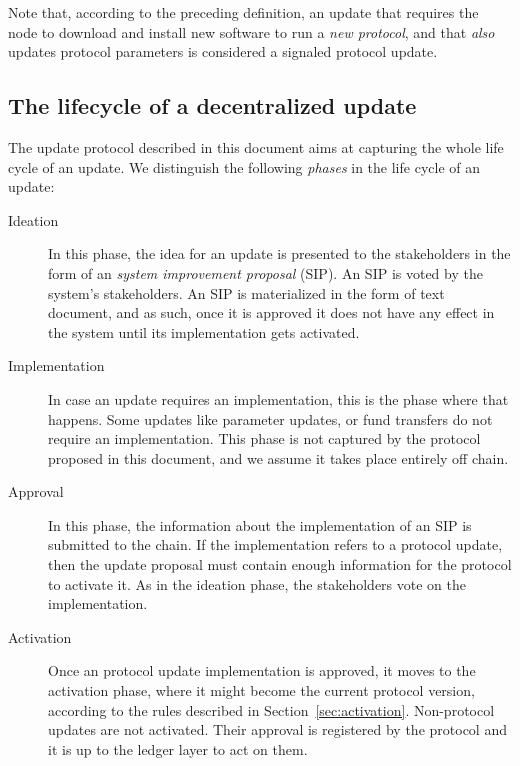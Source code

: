\documentclass[11pt,a4paper]{article}
\begin{document}
Note that, according to the preceding definition, an update that requires the
node to download and install new software to run a \emph{new protocol}, and that
\emph{also} updates protocol parameters is considered a signaled protocol
update.



\subsection{The lifecycle of a decentralized update}
\label{sec:phases-an-update}

The update protocol described in this document aims at capturing the whole life
cycle of an update.
%
%
We distinguish the following \emph{phases} in the life cycle of an update:

\begin{description}
\item[Ideation] In this phase, the idea for an update is presented to the
  stakeholders in the form of an \emph{system improvement proposal} (SIP). An
  SIP is voted by the system's stakeholders. An SIP is materialized in the form
  of text document, and as such, once it is approved it does not have any effect
  in the system until its implementation gets activated.
\item[Implementation] In case an update requires an implementation, this is the
  phase where that happens. Some updates like parameter updates, or fund
  transfers do not require an implementation. This phase is not captured by the
  protocol proposed in this document, and we assume it takes place entirely off
  chain.
\item[Approval] In this phase, the information about the implementation of an
  SIP is submitted to the chain. If the implementation refers to a protocol
  update, then the update proposal must contain enough information for the
  protocol to activate it. As in the ideation phase, the stakeholders vote on
  the implementation.
\item[Activation] Once an protocol update implementation is approved, it moves
  to the activation phase, where it might become the current protocol version,
  according to the rules described in Section~\ref{sec:activation}. Non-protocol
  updates are not activated. Their approval is registered by the protocol and
  it is up to the ledger layer to act on them.
\end{description}
\end{document}
